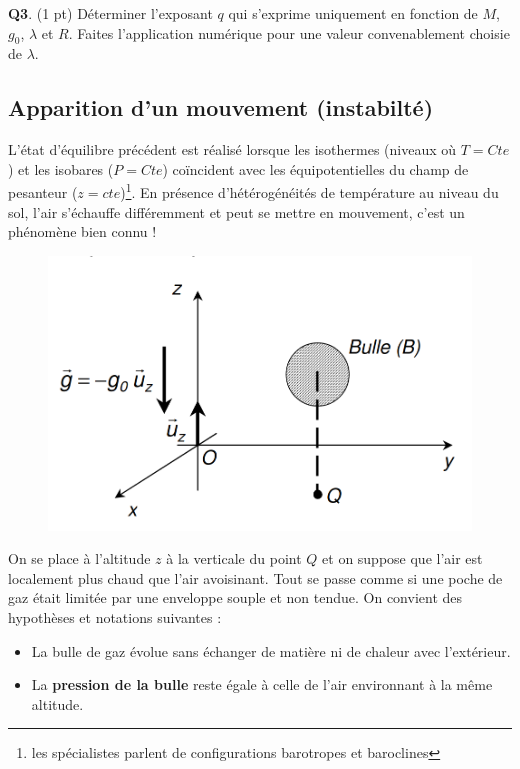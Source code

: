 \documentclass[letterpaper, 11pt]{article}
\begin{document}
\begin{itemize}
\begin{itemize}
\textbf{Q3}. (1 pt) Déterminer l’exposant \(q\) qui s'exprime uniquement en fonction de \(M\), \(g_0\), \(\lambda\) et \(R\). Faites l'application numérique pour une valeur convenablement choisie de \(\lambda\).


\subsection{Apparition d'un mouvement (instabilté)}
\label{sec:org15feed9}

L'état d'équilibre précédent est réalisé lorsque les isothermes (niveaux où \(T=Cte\)) et les isobares (\(P=Cte\)) coïncident avec les équipotentielles du champ de pesanteur (\(z = cte\))\footnote{les spécialistes parlent de configurations barotropes et baroclines}. En présence d’hétérogénéités de température au niveau du sol, l'air s'échauffe différemment et peut se mettre en mouvement, c'est un phénomène bien connu ! 

\bigskip

\begin{figure}[htbp]
\centering
\includegraphics[width=.9\linewidth]{./Ex2a.png}
\end{figure}

On se place à l'altitude \(z\) à la verticale du point \(Q\) et on suppose que l'air est localement plus chaud que l'air avoisinant. Tout se passe comme si une poche de gaz était limitée par une enveloppe souple et non tendue. On convient des hypothèses et notations suivantes : 

\begin{itemize}
\item La bulle de gaz évolue sans échanger de matière ni de chaleur avec l'extérieur.

\item La \textbf{pression de la bulle} reste égale à celle de l'air environnant à la même altitude.


\end{itemize}
\end{itemize}
\end{itemize}
\end{document}
